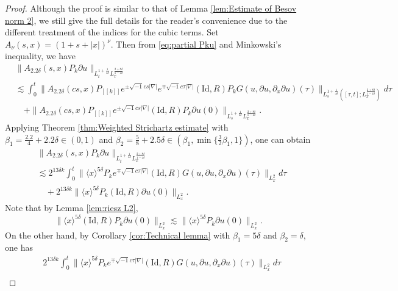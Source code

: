 \documentclass[11pt,twoside]{article}
\def\f{\frac}
\def\p{\partial}
\def\ls{\lesssim}
\newcommand{\w}[1]{\langle {#1} \rangle}
\theoremstyle{plain}
\theoremstyle{definition}
\numberwithin{equation}{section}
\begin{document}
\begin{proof}
Although the proof is similar to that of Lemma \ref{lem:Estimate of Besov norm 2}, we still give the full details for the reader's convenience due to the different treatment of the indices for the cubic terms. Set $A_\nu(s,x)=(1+s+|x|)^{\nu}$. Then from \eqref{eq:partial Pku} and Minkowski's inequality, we have
	\begin{equation*}
	\begin{split}
	&\|A_{2.2\delta}(s,x)P_k\p u\|_{L_t^{1+\f{1}{4\delta}}L^{\f{2+8\delta}{1-4\delta}}_x}\\
	&\ls
	\int_{0}^{t} \big\| A_{2.2\delta}(cs,x)P_{[[k]]}e^{\pm \sqrt{-1}cs|\nabla|} e^{\mp \sqrt{-1}c\tau|\nabla|} (\mathrm{Id},R)
	 P_k G(u,\partial u,\p_x\p u)(\tau)\big\|_{L^{1+\f{1}{4\delta}}_s([\tau,t];L^{\f{2+8\delta}{1-4\delta}}_x)}d\tau\\
	&\quad+\| A_{2.2\delta}(cs,x)P_{[[k]]}e^{\pm \sqrt{-1}cs|\nabla|}(\mathrm{Id},R) P_k\partial u(0)\|_{L_s^{1+\f{1}{4\delta}}L^{\f{2+8\delta}{1-4\delta}}_x}.
	\end{split}
	\end{equation*}
	Applying Theorem \ref{thm:Weighted Strichartz estimate} with $\beta_1 = \f{2.2}{4}+2.2\delta\in(0,1)$ and $\beta_2 = \f58+2.5\delta\in(\beta_1,\min\{\f32\beta_1,1\})$, one can obtain
	\begin{equation}\label{3.34}
	\begin{split}
	&\|A_{2.2\delta}(s,x)P_k\p u\|_{L_t^{1+\f{1}{4\delta}}L^{\f{2+8\delta}{1-4\delta}}_x}\\
	&\ls
	2^{ 13\delta k}
	\int_{0}^{t}\big\|\w{x}^{5\delta}P_ke^{\mp \sqrt{-1}c\tau|\nabla|} (\mathrm{Id},R) G(u,\partial u,\p_x\p u)(\tau)\big\|_{L^2_x}d\tau\\
	&\quad+2^{ 13\delta k}
	\|\w{x}^{5\delta}P_k(\mathrm{Id},R)\partial u(0)\|_{L^2_x}.
	\end{split}
	\end{equation}
	Note that by Lemma \ref{lem:riesz L2},
	\begin{equation}\label{3.35}
	\|\w{x}^{5\delta}(\mathrm{Id},R)P_k\partial u(0)\|_{L^2_x}
	\ls
	\|\w{x}^{5\delta}P_k\partial u(0)\|_{L^2_x}.
	\end{equation}
	On the other hand, by Corollary \ref{cor:Technical lemma} with $\beta_1=5\delta$ and $\beta_2=\delta$, one has
	\begin{equation*}
	\begin{split}
	&2^{ 13\delta k}
	\int_{0}^{t}\big\|\w{x}^{5\delta}P_ke^{\mp \sqrt{-1}c\tau|\nabla|} (\mathrm{Id},R) G(u,\partial u,\p_x\p u)(\tau)\big\|_{L^2_x}d\tau\\

\end{split}
\end{equation*}
\end{proof}
\end{document}
